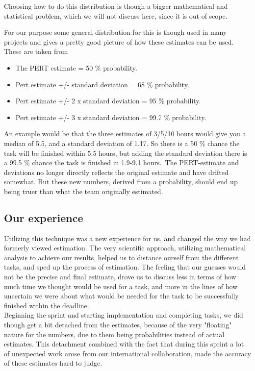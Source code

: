 Choosing how to do this distribution is though a bigger mathematical and statistical problem, which we will not discuss here, since it is out of scope.

For our purpose some general distribution for this is though used in many projects and gives a pretty good picture of how these estimates can be used. These are taken from \cite{3point_w}\
\begin{itemize}

\item The PERT estimate = 50 \% probability.
\item Pert estimate +/- standard deviation = 68 \% probability.
\item Pert estimate +/- 2 x standard deviation = 95 \% probability.
\item Pert estimate +/- 3 x standard deviation = 99.7 \% probability.
\end{itemize}
An example would be that the three estimates of 3/5/10 hours would give you a median of 5.5, and a standard deviation of 1.17. So there is a 50 \% chance the task will be finished within 5.5 hours, but adding the standard deviation there is a 99.5 \% chance the task is finished in 1.9-9.1 hours.\
The PERT-estimate and deviations no longer directly reflects the original estimate and have drifted somewhat. But these new numbers, derived from a probability, should end up being truer than what the team originally estimated. \\



\subsection{Our experience}
Utilizing this technique was a new experience for us, and changed the way we had formerly viewed estimation. The very scientific approach, utilizing mathematical analysis to achieve our results, helped us to distance ourself from the different tasks, and sped up the process of estimation. The feeling that our guesses would not be the precise and final estimate, drove us to discuss less in terms of how much time we thought would be used for a task, and more in the lines of how uncertain we were about what would be needed for the task to be successfully finished within the deadline. \\

Beginning the sprint and starting implementation and completing tasks, we did though get a bit detached from the estimates, because of the very "floating" nature for the numbers, due to them being probabilities instead of actual estimates. This detachment combined with the fact that during this sprint a lot of unexpected work arose from our international collaboration, made the accuracy of these estimates hard to judge. \\

